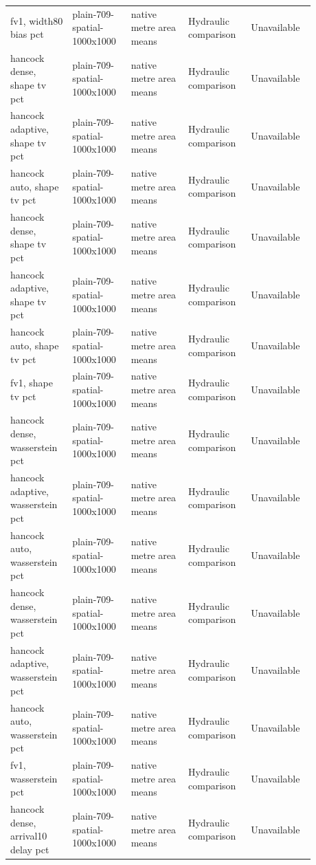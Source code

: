 \begin{longtable}{p{0.1760\linewidth}p{0.1760\linewidth}p{0.1760\linewidth}p{0.1760\linewidth}p{0.1760\linewidth}}
fv1, width80 bias pct & plain-709-spatial-1000x1000 & native metre area means & Hydraulic comparison & Unavailable \\
hancock dense, shape tv pct & plain-709-spatial-1000x1000 & native metre area means & Hydraulic comparison & Unavailable \\
hancock adaptive, shape tv pct & plain-709-spatial-1000x1000 & native metre area means & Hydraulic comparison & Unavailable \\
hancock auto, shape tv pct & plain-709-spatial-1000x1000 & native metre area means & Hydraulic comparison & Unavailable \\
hancock dense, shape tv pct & plain-709-spatial-1000x1000 & native metre area means & Hydraulic comparison & Unavailable \\
hancock adaptive, shape tv pct & plain-709-spatial-1000x1000 & native metre area means & Hydraulic comparison & Unavailable \\
hancock auto, shape tv pct & plain-709-spatial-1000x1000 & native metre area means & Hydraulic comparison & Unavailable \\
fv1, shape tv pct & plain-709-spatial-1000x1000 & native metre area means & Hydraulic comparison & Unavailable \\
hancock dense, wasserstein pct & plain-709-spatial-1000x1000 & native metre area means & Hydraulic comparison & Unavailable \\
hancock adaptive, wasserstein pct & plain-709-spatial-1000x1000 & native metre area means & Hydraulic comparison & Unavailable \\
hancock auto, wasserstein pct & plain-709-spatial-1000x1000 & native metre area means & Hydraulic comparison & Unavailable \\
hancock dense, wasserstein pct & plain-709-spatial-1000x1000 & native metre area means & Hydraulic comparison & Unavailable \\
hancock adaptive, wasserstein pct & plain-709-spatial-1000x1000 & native metre area means & Hydraulic comparison & Unavailable \\
hancock auto, wasserstein pct & plain-709-spatial-1000x1000 & native metre area means & Hydraulic comparison & Unavailable \\
fv1, wasserstein pct & plain-709-spatial-1000x1000 & native metre area means & Hydraulic comparison & Unavailable \\
hancock dense, arrival10 delay pct & plain-709-spatial-1000x1000 & native metre area means & Hydraulic comparison & Unavailable \\

\end{longtable}
